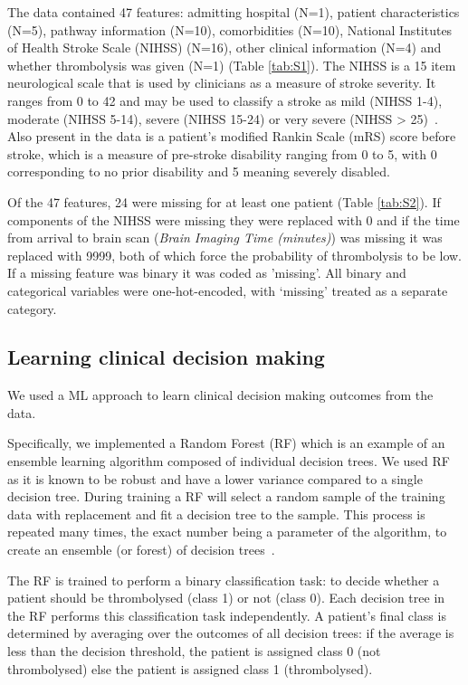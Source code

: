 \documentclass[12pt,a4paper, pdftex]{elsarticle}
\begin{document}
The data contained 47 features: admitting hospital (N=1), patient characteristics (N=5), pathway information (N=10), comorbidities (N=10), National Institutes of Health Stroke Scale (NIHSS) (N=16), other clinical information (N=4) and whether thrombolysis was given (N=1) (Table \ref{tab:S1}). 
The NIHSS is a 15 item neurological scale that is used by clinicians as a measure of stroke severity. It ranges from 0 to 42 and may be used to classify a stroke as mild (NIHSS 1-4), moderate (NIHSS 5-14), severe (NIHSS 15-24) or very severe (NIHSS > 25)~\cite{brott1989measurements}. Also present in the data is a patient's modified Rankin Scale (mRS) score before stroke, which is a measure of pre-stroke disability ranging from 0 to 5, with 0 corresponding to no prior disability and 5 meaning severely disabled.

Of the 47 features, 24 were missing for at least one patient (Table \ref{tab:S2}). If components of the NIHSS were missing they were replaced with 0 and if the time from arrival to brain scan ({\it Brain Imaging Time (minutes)}) was missing it was replaced with 9999, both of which force the probability of thrombolysis to be low. If a missing feature was binary it was coded as 'missing'. All binary and categorical variables were one-hot-encoded, with `missing' treated as a separate category. 


\subsection{Learning clinical decision making}

We used a ML approach to learn clinical decision making outcomes from the data. 

Specifically, we implemented a Random Forest (RF) which is an example of an ensemble learning algorithm composed of individual decision trees. We used RF as it is known to be robust and have a lower variance compared to a single decision tree. 
During training a RF will select a random sample of the training data with replacement and fit a decision tree to the sample. This process is repeated many times, the exact number being a parameter of the algorithm, to create an ensemble (or forest) of decision trees~\cite{breiman2001random}.

The RF is trained to perform a binary classification task: to decide whether a patient should be thrombolysed (class 1) or not (class 0). Each decision tree in the RF performs this classification task independently. A patient's final class is determined by averaging over the outcomes of all decision trees: if the average is less than the decision threshold, the patient is assigned class 0 (not thrombolysed) else the patient is assigned class 1 (thrombolysed).
\end{document}
